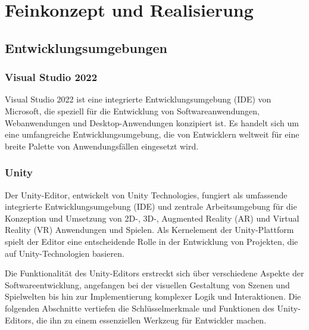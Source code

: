 

\chapter{Feinkonzept und Realisierung}

\section{Entwicklungsumgebungen}
\subsection{Visual Studio 2022}
Visual Studio 2022 ist eine integrierte Entwicklungsumgebung (IDE) von Microsoft, die speziell für die Entwicklung von
Softwareanwendungen, Webanwendungen und Desktop-Anwendungen konzipiert ist. Es handelt sich um eine umfangreiche
Entwicklungsumgebung, die von Entwicklern weltweit für eine breite Palette von Anwendungsfällen eingesetzt wird.

\subsection{Unity}
Der Unity-Editor, entwickelt von Unity Technologies, fungiert als umfassende integrierte Entwicklungsumgebung (IDE)
und zentrale Arbeitsumgebung für die Konzeption und Umsetzung von 2D-, 3D-, Augmented Reality (AR) und Virtual Reality
(VR) Anwendungen und Spielen. Als Kernelement der Unity-Plattform spielt der Editor eine entscheidende Rolle in der
Entwicklung von Projekten, die auf Unity-Technologien basieren.

Die Funktionalität des Unity-Editors erstreckt sich über verschiedene Aspekte der Softwareentwicklung, angefangen bei
der visuellen Gestaltung von Szenen und Spielwelten bis hin zur Implementierung komplexer Logik und Interaktionen. Die
folgenden Abschnitte vertiefen die Schlüsselmerkmale und Funktionen des Unity-Editors, die ihn zu einem essenziellen
Werkzeug für Entwickler machen.

